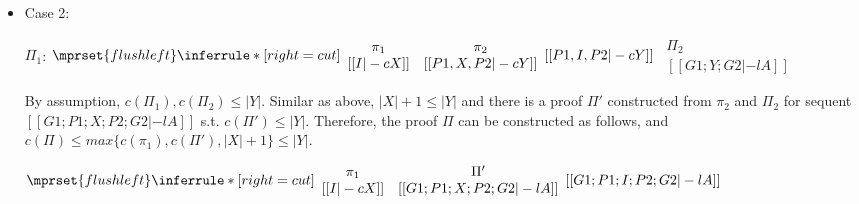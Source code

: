 \begin{itemize}
\item Case 2:
      \begin{center}
        \scriptsize
        $\Pi_1$:
        \begin{math}
          $$\mprset{flushleft}
          \inferrule* [right={\tiny cut}] {
            {
              \begin{array}{cc}
                \pi_1 & \pi_2 \\
                {[[I |-c X]]} & {[[P1, X, P2 |-c Y]]}
              \end{array}
            }
          }{[[P1, I, P2 |-c Y]]}
        \end{math}
        \qquad\qquad
        \begin{math}
          \begin{array}{c}
            \Pi_2 \\
            {[[G1; Y; G2 |-l A]]}
          \end{array}
        \end{math}
      \end{center}
      By assumption, $c(\Pi_1),c(\Pi_2)\leq |Y|$. Similar as above,
      $|X|+1\leq |Y|$ and there is a proof $\Pi'$ constructed from $\pi_2$
      and $\Pi_2$ for sequent $[[G1; P1; X; P2; G2 |-l A]]$ s.t.
      $c(\Pi')\leq|Y|$. Therefore, the proof $\Pi$ can be constructed as
      follows, and $c(\Pi)\leq max\{c(\pi_1),c(\Pi'),|X|+1\}\leq |Y|$.
      \begin{center}
        \scriptsize
        \begin{math}
          $$\mprset{flushleft}
          \inferrule* [right={\tiny cut}] {
            {
              \begin{array}{cc}
                \pi_1 & \Pi'\\
                {[[I |-c X]]} & {[[G1; P1; X; P2; G2 |-l A]]}
              \end{array}
            }
          }{[[G1; P1; I; P2; G2 |-l A]]}
        \end{math}
      \end{center}
\end{itemize}

